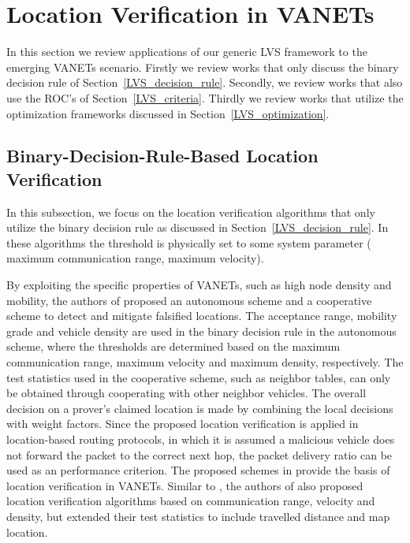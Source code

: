 \documentclass[journal]{IEEEtran}
\begin{document}
\section{Location Verification in VANETs}\label{VANET}

In this section we review  applications of our generic LVS framework to the emerging VANETs scenario. Firstly we review works that only discuss the binary decision rule of Section~\ref{LVS_decision_rule}. Secondly, we review works that also use the ROC's of Section~\ref{LVS_criteria}. Thirdly we review works that utilize the optimization frameworks discussed in Section~\ref{LVS_optimization}.





\subsection{Binary-Decision-Rule-Based Location Verification}


In this subsection, we focus on the location verification algorithms that only utilize the binary decision rule as discussed in Section~\ref{LVS_decision_rule}. In these algorithms the threshold is physically set to some system parameter ( maximum communication range, maximum velocity).


By exploiting the specific properties of VANETs, such as high node density and mobility, the authors of \cite{leinmuller2006position} proposed an autonomous scheme  and a cooperative scheme to detect and mitigate falsified locations. The acceptance range, mobility grade and vehicle density are used in the binary decision rule in the autonomous scheme, where the thresholds are determined based on the maximum communication range, maximum velocity and maximum density, respectively. The test statistics used in the cooperative scheme, such as neighbor tables, can only be obtained through cooperating with other neighbor vehicles. The overall decision on a prover's claimed location is made by combining the local decisions with weight factors. Since the proposed location verification is applied in location-based routing protocols, in which it is assumed a malicious vehicle does not forward the packet to the correct next hop, the packet delivery ratio can be used as an performance criterion. The proposed schemes in \cite{leinmuller2006position} provide the basis of location verification in VANETs. Similar to \cite{leinmuller2006position}, the authors of \cite{alsharif2011mitigating} also proposed location verification algorithms based on communication range, velocity and density, but extended their test statistics to include  travelled distance and map location.
\end{document}
